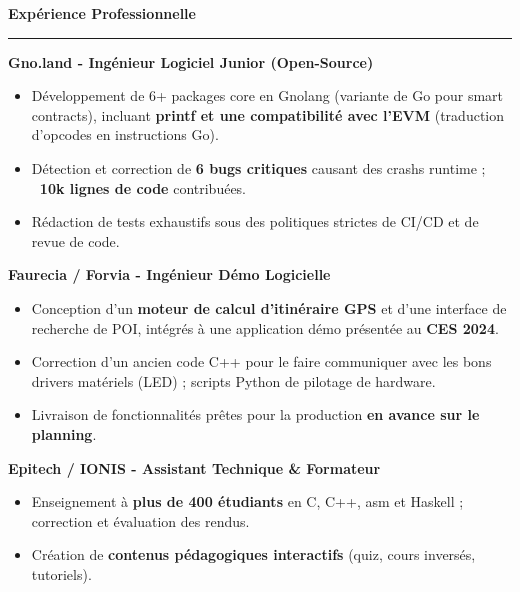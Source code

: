 \documentclass[9pt]{extarticle}
\begin{document}
\par\vspace{5pt}

{\large\bfseries Expérience Professionnelle}
\par\vspace{-8pt}
\rule{\linewidth}{0.4pt}
\par\vspace{5pt}

{\bfseries Gno.land - Ingénieur Logiciel Junior (Open-Source)}
\begin{itemize}[noitemsep, topsep=0pt]
	\item Développement de 6+ packages core en Gnolang (variante de Go pour smart contracts), incluant {\bfseries printf et une compatibilité avec l'EVM} (traduction d'opcodes en instructions Go).
	\item Détection et correction de {\bfseries 6 bugs critiques} causant des crashs runtime ; {\bfseries ~10k lignes de code} contribuées.
	\item Rédaction de tests exhaustifs sous des politiques strictes de CI/CD et de revue de code.
\end{itemize}

\par\vspace{5pt}

{\bfseries Faurecia / Forvia - Ingénieur Démo Logicielle}
\begin{itemize}[noitemsep, topsep=0pt]
	\item Conception d'un {\bfseries moteur de calcul d'itinéraire GPS} et d'une interface de recherche de POI, intégrés à une application démo présentée au {\bfseries CES 2024}.
	\item Correction d'un ancien code C++ pour le faire communiquer avec les bons drivers matériels (LED) ; scripts Python de pilotage de hardware.
	\item Livraison de fonctionnalités prêtes pour la production {\bfseries en avance sur le planning}.
\end{itemize}

\par\vspace{5pt}

{\bfseries Epitech / IONIS - Assistant Technique \& Formateur}
\begin{itemize}[noitemsep, topsep=0pt]
	\item Enseignement à {\bfseries plus de 400 étudiants} en C, C++, asm et Haskell ; correction et évaluation des rendus.
	\item Création de {\bfseries contenus pédagogiques interactifs} (quiz, cours inversés, tutoriels).
\end{itemize}
\end{document}

